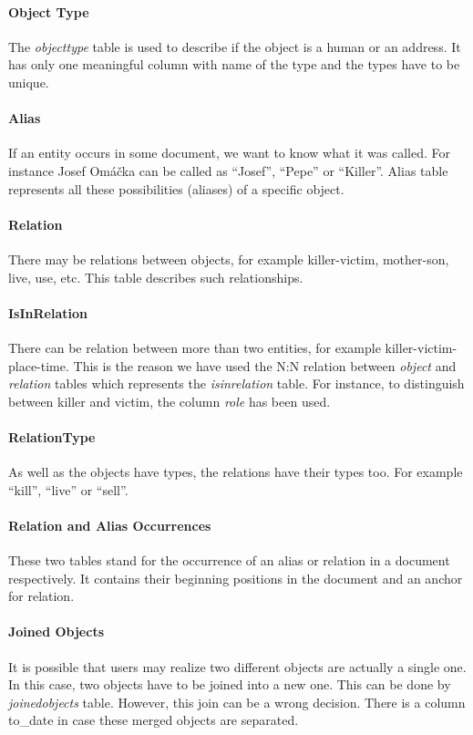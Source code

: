 \paragraph{Object Type} The \emph{objecttype} table is used to describe if the
object is a human or an address. It has only one meaningful column with name of
the type and the types have to be unique.

\paragraph{Alias} If an entity occurs in some document, we want to know what it
was called. For instance Josef Omáčka can be called as ``Josef'', ``Pepe'' or
``Killer''. Alias table represents all these possibilities (aliases) 
of a specific object.

\paragraph{Relation} There may be relations between objects, for example
killer-victim, mother-son, live, use, etc. This table describes such
relationships. 

\paragraph{IsInRelation} There can be relation between more than two entities,
for example  killer-victim-place-time. This is the reason we have used the N:N
relation  between \emph{object} and \emph{relation} tables which represents the
\emph{isinrelation} table. For instance, to distinguish between killer and
victim, the column \emph{role} has been used.

\paragraph{RelationType} As well as the objects have types, the relations have their
types too. For example ``kill'', ``live'' or ``sell''.

\paragraph{Relation and Alias Occurrences} These two tables stand for the
occurrence of an alias or relation in a document respectively. It contains their
beginning positions in the document and an anchor for relation. 

\paragraph{Joined Objects} It is possible that users may realize two different
objects are actually a single one. In this case, two objects have to be joined
into a new one. This can be done by \emph{joinedobjects} table. However, this
join can be a wrong decision. There is a column to\_{}date in case these merged
objects are separated.

